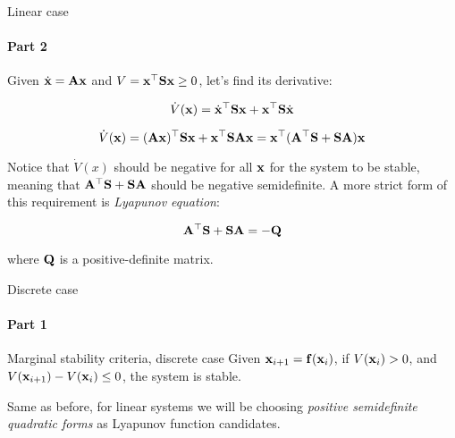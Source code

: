 \documentclass{beamer}
\begin{document}
\begin{frame}{Linear case}
\framesubtitle{Part 2}
\begin{flushleft}

Given $\dot{\mathbf{x}} = \mathbf{A}\mathbf{x}$ and $V = \mathbf{x}^\top\mathbf{S}\mathbf{x} \geq 0$, let's find its derivative:

\begin{equation}
    \dot V(\mathbf{x}) = \dot{\mathbf{x}}^\top\mathbf{S}\mathbf{x} + 
    \mathbf{x}^\top\mathbf{S}\dot{\mathbf{x}}
\end{equation}

\begin{equation}
    \dot V(\mathbf{x}) = (\mathbf{A}\mathbf{x})^\top\mathbf{S}\mathbf{x} + 
    \mathbf{x}^\top\mathbf{S}\mathbf{A}\mathbf{x} = 
    \mathbf{x}^\top(\mathbf{A}^\top\mathbf{S} + \mathbf{S}\mathbf{A})\mathbf{x}
\end{equation}

Notice that $\dot V(x)$ should be negative for all $\mathbf{x}$ for the system to be stable, meaning that $\mathbf{A}^\top\mathbf{S} + \mathbf{S}\mathbf{A}$ should be negative semidefinite. A more strict form of this requirement is \emph{Lyapunov equation}:

\begin{equation}
    \mathbf{A}^\top\mathbf{S} + \mathbf{S}\mathbf{A} = -\mathbf{Q}
\end{equation}

where $\mathbf{Q}$ is a positive-definite matrix.

\end{flushleft}
\end{frame}



\begin{frame}{Discrete case}
\framesubtitle{Part 1}
\begin{flushleft}

\begin{block}{Marginal stability criteria, discrete case}
Given $\mathbf{x}_{i+1} = \mathbf{f}(\mathbf{x}_i)$, if $V(\mathbf{x}_i) > 0$, and $V(\mathbf{x}_{i+1}) - V(\mathbf{x}_i) \leq 0$, the system is stable.
\end{block}

\bigskip 

Same as before, for linear systems we will be choosing \emph{positive semidefinite quadratic forms} as Lyapunov function candidates.

\end{flushleft}
\end{frame}
\end{document}
